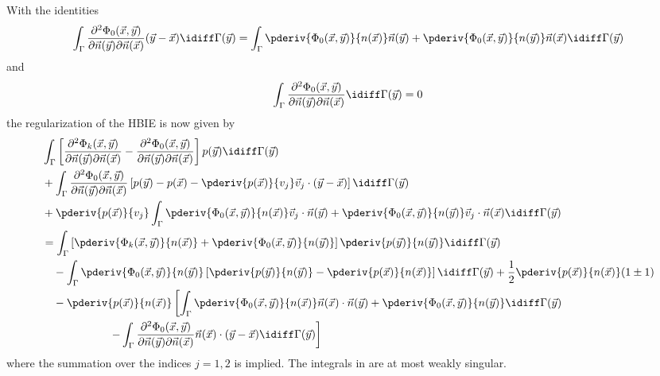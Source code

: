 With the identities~\cite{Liu1999anf}
\begin{equation*}
	\int_\Gamma\frac{\partial^2\Phi_0(\vec{x},\vec{y})}{\partial\vec{n}(\vec{y})\partial\vec{n}(\vec{x})} (\vec{y}-\vec{x})\idiff\Gamma(\vec{y}) = \int_\Gamma \pderiv{\Phi_0(\vec{x},\vec{y})}{n(\vec{x})} \vec{n}(\vec{y})
	+ \pderiv{\Phi_0(\vec{x},\vec{y})}{n(\vec{y})}\vec{n}(\vec{x}) \idiff\Gamma(\vec{y})
\end{equation*}
and
\begin{equation*}
	\int_\Gamma\frac{\partial^2\Phi_0(\vec{x},\vec{y})}{\partial\vec{n}(\vec{y})\partial\vec{n}(\vec{x})}\idiff\Gamma(\vec{y}) = 0
\end{equation*}
the regularization of the HBIE is now given by
\begin{align}\label{Eq3:regulHBIE}
\begin{split}
	&\int_\Gamma\left[\frac{\partial^2\Phi_k(\vec{x},\vec{y})}{\partial\vec{n}(\vec{y})\partial\vec{n}(\vec{x})} - \frac{\partial^2\Phi_0(\vec{x},\vec{y})}{\partial\vec{n}(\vec{y})\partial\vec{n}(\vec{x})}\right] p(\vec{y}) \idiff\Gamma(\vec{y}) \\
	&+\int_\Gamma \frac{\partial^2\Phi_0(\vec{x},\vec{y})}{\partial\vec{n}(\vec{y})\partial\vec{n}(\vec{x})}\left[ p(\vec{y}) - p(\vec{x}) - \pderiv{p(\vec{x})}{v_j} \vec{v}_j\cdot(\vec{y}-\vec{x})\right] \idiff\Gamma(\vec{y})\\
	&+\pderiv{p(\vec{x})}{v_j}\int_\Gamma \pderiv{\Phi_0(\vec{x},\vec{y})}{n(\vec{x})}\vec{v}_j\cdot \vec{n}(\vec{y})
	+ \pderiv{\Phi_0(\vec{x},\vec{y})}{n(\vec{y})}\vec{v}_j\cdot \vec{n}(\vec{x}) \idiff\Gamma(\vec{y}) \\
	&= \int_\Gamma \left[\pderiv{\Phi_k(\vec{x},\vec{y})}{n(\vec{x})}+\pderiv{\Phi_0(\vec{x},\vec{y})}{n(\vec{y})}\right] \pderiv{p(\vec{y})}{n(\vec{y})} \idiff\Gamma(\vec{y}) \\
	&{\hskip1em\relax}-\int_\Gamma \pderiv{\Phi_0(\vec{x},\vec{y})}{n(\vec{y})}\left[ \pderiv{p(\vec{y})}{n(\vec{y})} - \pderiv{p(\vec{x})}{n(\vec{x})}\right]\idiff\Gamma(\vec{y}) + \frac{1}{2}\pderiv{p(\vec{x})}{n(\vec{x})}(1\pm 1)\\
	&{\hskip1em\relax}-\pderiv{p(\vec{x})}{n(\vec{x})}\left[\int_\Gamma \pderiv{\Phi_0(\vec{x},\vec{y})}{n(\vec{x})}\vec{n}(\vec{x})\cdot \vec{n}(\vec{y}) + \pderiv{\Phi_0(\vec{x},\vec{y})}{n(\vec{y})} \idiff\Gamma(\vec{y})\right.\\
	&{\hskip6em\relax}\left. - \int_\Gamma \frac{\partial^2\Phi_0(\vec{x},\vec{y})}{\partial\vec{n}(\vec{y})\partial\vec{n}(\vec{x})}\vec{n}(\vec{x})\cdot(\vec{y}-\vec{x}) \idiff\Gamma(\vec{y})\right]
	\end{split}
\end{align}
where the summation over the indices $j=1,2$ is implied. The integrals in  are at most weakly singular.

